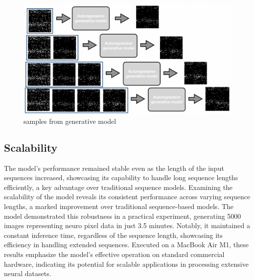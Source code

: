 \begin{figure}
    \centering
    \includegraphics[width=1.0\linewidth]{figures/neuropixel_generation.png}  
    \caption{samples from generative model}
    \label{fig:your_label}  %
  \end{figure}

\subsection{Scalability}

The model's performance remained stable even as the length of the input sequences increased, showcasing its capability to handle long sequence lengths efficiently, a key advantage over traditional sequence models. Examining the scalability of the model reveals its consistent performance across varying sequence lengths, a marked improvement over traditional sequence-based models. The model demonstrated this robustness in a practical experiment, generating 5000 images representing neuro pixel data in just 3.5 minutes. Notably, it maintained a constant inference time, regardless of the sequence length, showcasing its efficiency in handling extended sequences. Executed on a MacBook Air M1, these results emphasize the model's effective operation on standard commercial hardware, indicating its potential for scalable applications in processing extensive neural datasets.